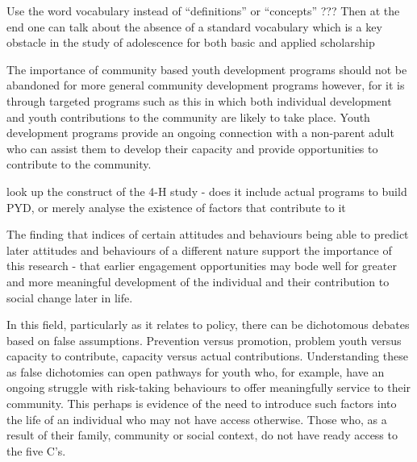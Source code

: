 Use the word vocabulary instead of “definitions” or “concepts” ??? Then at the end one can talk about the absence of a standard vocabulary which is a key obstacle in the study of adolescence for both basic and applied scholarship


The importance of community based youth development programs should not be abandoned for more general community development programs however, for it is through targeted programs such as this in which both individual development and youth contributions to the community are likely to take place. \citep{Lerner2005}
Youth development programs provide an ongoing connection with a non-parent adult who can assist them to develop their capacity and provide opportunities to contribute to the community. \citep{Lerner2005}


look up the construct of the 4-H study - does it include actual programs to build PYD, or merely analyse the existence of factors that contribute to it %

The finding that indices of certain attitudes and behaviours being able to predict later attitudes and behaviours of a different nature support the importance of this research - that earlier engagement opportunities may bode well for greater and more meaningful development of the individual and their contribution to social change later in life. \citep{Jelicic2007}

In this field, particularly as it relates to policy, there can be dichotomous debates based on false assumptions. Prevention versus promotion, problem youth versus capacity to contribute, capacity versus actual contributions. Understanding these as false dichotomies can open pathways for youth who, for example, have an ongoing struggle with risk-taking behaviours to offer meaningfully service to their community. This perhaps is evidence of the need to introduce such factors into the life of an individual who may not have access otherwise. Those who, as a result of their family, community or social context, do not have ready access to the five C's. \citep{Jelicic2007}



